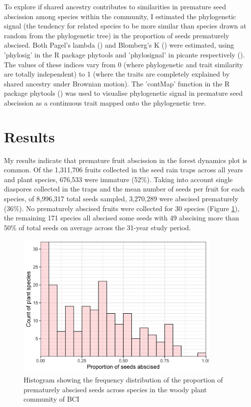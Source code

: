To explore if shared ancestry contributes to similarities in premature seed abscission among species within the community, I estimated the phylogenetic signal (the tendency for related species to be more similar than species drawn at random from the phylogenetic tree) in the proportion of seeds prematurely abscised. Both Pagel’s lambda (\cite{pagelInferringHistoricalPatterns1999, pagelInferringEvolutionaryProcesses1997}) and Blomberg’s K (\cite{blombergTestingPhylogeneticSignal2003}) were estimated, using 'phylosig' in the R package phytools and 'phylosignal' in picante respectively (\cite{revellPhytoolsPhylogeneticTools2020, kembelPicanteIntegratingPhylogenies2020}). The values of these indices vary from 0 (where phylogenetic and trait similarity are totally independent) to 1 (where the traits are completely explained by shared ancestry under Brownian motion). The 'contMap' function in the R package phytools (\cite{revellPhytoolsPhylogeneticTools2020}) was used to visualise phylogenetic signal in premature seed abscission as a continuous trait mapped onto the phylogenetic tree.



\section{Results}
My results indicate that premature fruit abscission in the forest dynamics plot is common. Of the 1,311,706 fruits collected in the seed rain traps across all years and plant species, 676,533 were immature (52\%). Taking into account single diaspores collected in the traps and the mean number of seeds per fruit for each species, of 8,996,317 total seeds sampled, 3,270,289 were abscised prematurely (36\%). No prematurely abscised fruits were collected for 30 species (Figure \ref{fig:hist}), the remaining 171 species all abscised some seeds with 49 abscising more than 50\% of total seeds on average across the 31-year study period.

\begin{figure}[!h]
\centering
\includegraphics[width=10cm]{overallHist.png}
\caption{Histogram showing the frequency distribution of the proportion of prematurely abscised seeds across species in the woody plant community of BCI}
\label{fig:hist}
\end{figure}

